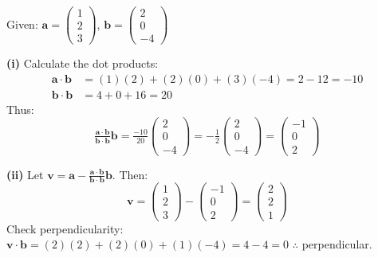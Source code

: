 \begin{solution}
Given: $\mathbf{a} = \begin{pmatrix} 1 \\ 2 \\ 3 \end{pmatrix}$, $\mathbf{b} = \begin{pmatrix} 2 \\ 0 \\ -4 \end{pmatrix}$

\textbf{(i)} Calculate the dot products:
\begin{align*}
\mathbf{a} \cdot \mathbf{b} &= (1)(2) + (2)(0) + (3)(-4) = 2 - 12 = -10 \\
\mathbf{b} \cdot \mathbf{b} &= 4 + 0 + 16 = 20
\end{align*}
Thus: 
$$\tfrac{\mathbf{a} \cdot \mathbf{b}}{\mathbf{b} \cdot \mathbf{b}} \mathbf{b} = \tfrac{-10}{20} \begin{pmatrix} 2 \\ 0 \\ -4 \end{pmatrix} = -\tfrac{1}{2} \begin{pmatrix} 2 \\ 0 \\ -4 \end{pmatrix} = \begin{pmatrix} -1 \\ 0 \\ 2 \end{pmatrix}$$
\vspace{1mm}

\textbf{(ii)} Let $\mathbf{v} = \mathbf{a} - \tfrac{\mathbf{a} \cdot \mathbf{b}}{\mathbf{b} \cdot \mathbf{b}} \mathbf{b}$. Then:
$$\mathbf{v} = \begin{pmatrix} 1 \\ 2 \\ 3 \end{pmatrix} - \begin{pmatrix} -1 \\ 0 \\ 2 \end{pmatrix} = \begin{pmatrix} 2 \\ 2 \\ 1 \end{pmatrix}$$
\vspace{-2mm}
Check perpendicularity: $\mathbf{v} \cdot \mathbf{b} = (2)(2) + (2)(0) + (1)(-4) = 4 - 4 = 0$ \quad $\therefore$ perpendicular.
\end{solution}

